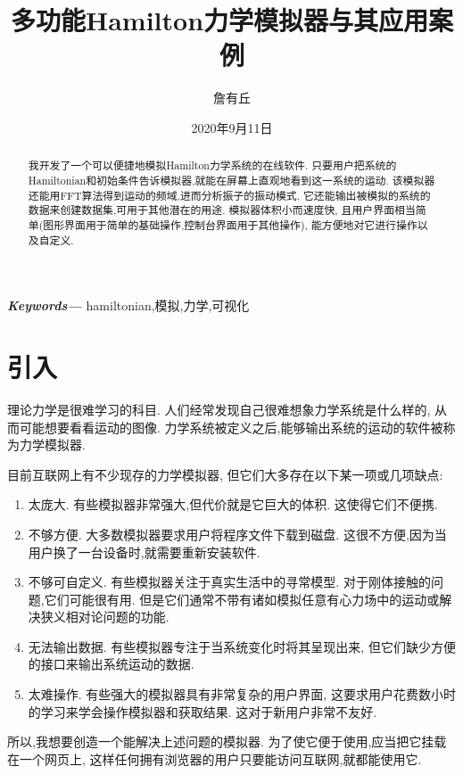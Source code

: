 \documentclass[12pt]{article}
\date{2020年9月11日}
\title{多功能Hamilton力学模拟器与其应用案例}
\author{詹有丘}
\providecommand{\keywords}[1]{\small\textbf{\textit{Keywords---}} #1}
\begin{document}
\maketitle

\begin{abstract}
我开发了一个可以便捷地模拟Hamilton力学系统的在线软件.
只要用户把系统的Hamiltonian和初始条件告诉模拟器,就能在屏幕上直观地看到这一系统的运动.
该模拟器还能用FFT算法得到运动的频域,进而分析振子的振动模式.
它还能输出被模拟的系统的数据来创建数据集,可用于其他潜在的用途.
模拟器体积小而速度快,
且用户界面相当简单(图形界面用于简单的基础操作,控制台界面用于其他操作),
能方便地对它进行操作以及自定义.
\end{abstract}

\keywords{hamiltonian,模拟,力学,可视化}

\tableofcontents

\section{引入}
\label{sec:intro}

理论力学是很难学习的科目.
人们经常发现自己很难想象力学系统是什么样的,
从而可能想要看看运动的图像.
力学系统被定义之后,能够输出系统的运动的软件被称为力学模拟器.

目前互联网上有不少现存的力学模拟器,
但它们大多存在以下某一项或几项缺点:
\begin{enumerate}
  \item 太庞大.
  有些模拟器非常强大,但代价就是它巨大的体积.
  这使得它们不便携.

  \item 不够方便.
  大多数模拟器要求用户将程序文件下载到磁盘.
  这很不方便,因为当用户换了一台设备时,就需要重新安装软件.

  \item 不够可自定义.
  有些模拟器关注于真实生活中的寻常模型.
  对于刚体接触的问题,它们可能很有用.
  但是它们通常不带有诸如模拟任意有心力场中的运动或解决狭义相对论问题的功能.

  \item 无法输出数据.
  有些模拟器专注于当系统变化时将其呈现出来,
  但它们缺少方便的接口来输出系统运动的数据.

  \item 太难操作.
  有些强大的模拟器具有非常复杂的用户界面,
  这要求用户花费数小时的学习来学会操作模拟器和获取结果.
  这对于新用户非常不友好.
\end{enumerate}

所以,我想要创造一个能解决上述问题的模拟器.
为了使它便于使用,应当把它挂载在一个网页上,
这样任何拥有浏览器的用户只要能访问互联网,就都能使用它.
\end{document}
